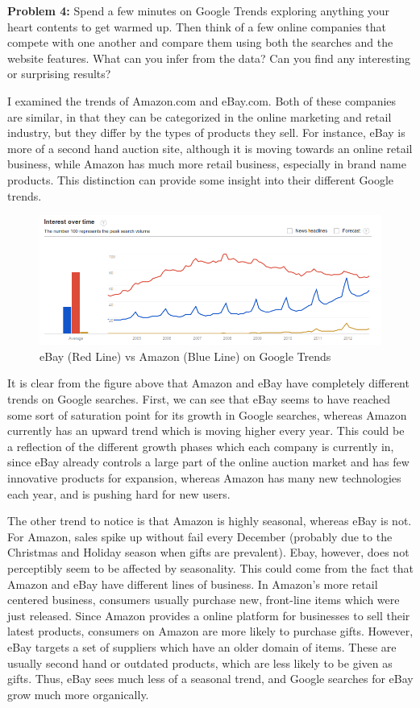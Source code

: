 \documentclass[psamsfonts]{amsart}
\newenvironment{sol}{\vspace{0.25cm}{\large \bfseries Solution:}}{\qedsymbol}
\newenvironment{prob}[1]{\begin{framed}{\large \bfseries Problem #1:}}{\end{framed}}
\begin{document}
\begin{prob}{4}
Spend a few minutes on Google Trends exploring anything your heart contents to get warmed up. Then think of a few online companies that compete with one another and compare them using both the searches and the website features. What can you infer from the data? Can you find any interesting or surprising results?
\end{prob}
\begin{sol}
I examined the trends of Amazon.com and eBay.com. Both of these companies are similar, in that they can be categorized in the online marketing and retail industry, but they differ by the types of products they sell. For instance, eBay is more of a second hand auction site, although it is moving towards an online retail business, while Amazon has much more retail business, especially in brand name products. This distinction can provide some insight into their different Google trends.

\begin{figure}[h!]
\includegraphics[width=6in]{ebay_vs_amazon.png}
\caption{eBay (Red Line) vs Amazon (Blue Line) on Google Trends}
\end{figure}

It is clear from the figure above that Amazon and eBay have completely different trends on Google searches. First, we can see that eBay seems to have reached some sort of saturation point for its growth in Google searches, whereas Amazon currently has an upward trend which is moving higher every year. This could be a reflection of the different growth phases which each company is currently in, since eBay already controls a large part of the online auction market and has few innovative products for expansion, whereas Amazon has many new technologies each year, and is pushing hard for new users. 

The other trend to notice is that Amazon is highly seasonal, whereas eBay is not. For Amazon, sales spike up without fail every December (probably due to the Christmas and Holiday season when gifts are prevalent). Ebay, however, does not perceptibly seem to be affected by seasonality. This could come from the fact that Amazon and eBay have different lines of business. In Amazon's more retail centered business, consumers usually purchase new, front-line items which were just released. Since Amazon provides a online platform for businesses to sell their latest products, consumers on Amazon are more likely to purchase gifts. However, eBay targets a set of suppliers which have an older domain of items. These are usually second hand or outdated products, which are less likely to be given as gifts. Thus, eBay sees much less of a seasonal trend, and Google searches for eBay grow much more organically.


\end{sol}
\end{document}
